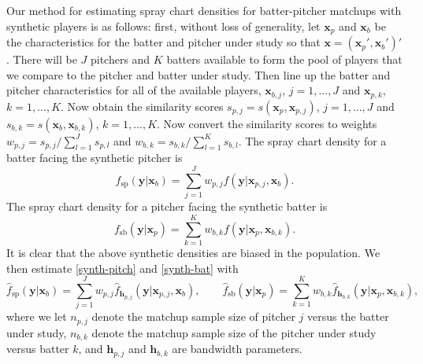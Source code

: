 \documentclass[11pt]{article}
\newcommand{\R}{\mathbb{R}}
\newcommand{\Xbf}{\textbf{X}}
\newcommand{\V}{\textbf{V}}
\newcommand{\W}{\textbf{W}}
\newcommand{\y}{\textbf{y}}
\newcommand{\x}{\textbf{x}}
\newcommand{\h}{\textbf{h}}
\newcommand{\Wstar}{\W^{\textstyle{*}}}
\begin{document}
Our method for estimating spray chart densities for batter-pitcher matchups with synthetic players is as follows: first, without loss of generality, let $\x_p$ and $\x_b$ be the characteristics for the batter and pitcher under study so that $\x = (\x_p',\x_b')'$. There will be $J$ pitchers and $K$ batters available to form the pool of players that we compare to the pitcher and batter under study. Then line up the batter and pitcher characteristics for all of the available players, $\x_{b,j}$, $j = 1,...,J$ and $\x_{p,k}$, $k = 1,...,K$. Now obtain the similarity scores $s_{p,j} = s(\x_p,\x_{p,j})$, $j = 1,...,J$ and $s_{b,k} = s(\x_b,\x_{b,k})$, $k = 1,...,K$. Now convert the similarity scores to weights $w_{p,j} = s_{p,j} / \sum_{l=1}^{J}s_{p,l}$ and $w_{b,k} = s_{b,k} / \sum_{l=1}^{K}s_{b,l}$. The spray chart density for a batter facing the synthetic pitcher is 
\begin{equation} \label{synth-pitch}
  f_{\text{sp}}(\y|\x_b) = \sum_{j=1}^J w_{p,j}f(\y|\x_{p,j},\x_b).
\end{equation}
The spray chart density for a pitcher facing the synthetic batter is 
\begin{equation} \label{synth-bat}
  f_{\text{sb}}(\y|\x_p) = \sum_{k=1}^K w_{b,k}f(\y|\x_p,\x_{b,k}).
\end{equation}
It is clear that the above synthetic densities are biased in the population. We then estimate \eqref{synth-pitch} and \eqref{synth-bat} with
\begin{equation} \label{synth-est}
  \hat f_{\text{sp}}(\y|\x_b) = \sum_{j=1}^J w_{p,j}\hat f_{\h_{p,j}}(\y|\x_{p,j},\x_b), 
  \qquad
  \hat f_{\text{sb}}(\y|\x_p) = \sum_{k=1}^K w_{b,k}\hat f_{\h_{b,k}}(\y|\x_p,\x_{b,k}),
\end{equation}
where we let $n_{p,j}$ denote the matchup sample size of pitcher $j$ versus the batter under study, $n_{b,k}$ denote the matchup sample size of the pitcher under study versus batter $k$, and $\h_{p,j}$ and $\h_{b,k}$ are bandwidth parameters.

\end{document}
